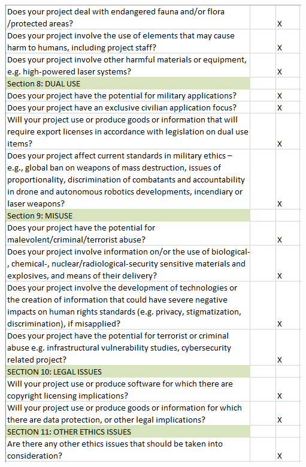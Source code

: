 \documentclass[12pt,twoside]{report}
\begin{document}
\begin{center}
\includegraphics[scale=0.55]{project_figures/LegEth2}
\end{center}









\end{document}
